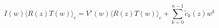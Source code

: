 \begin{equation}
I(w) \langle R(z) T(w) \rangle_c = V'(w) \langle R(z) T(w) \rangle_c +
\sum_{k=0}^{n-1} {\tilde c}_k(z) w^k
\end{equation}

